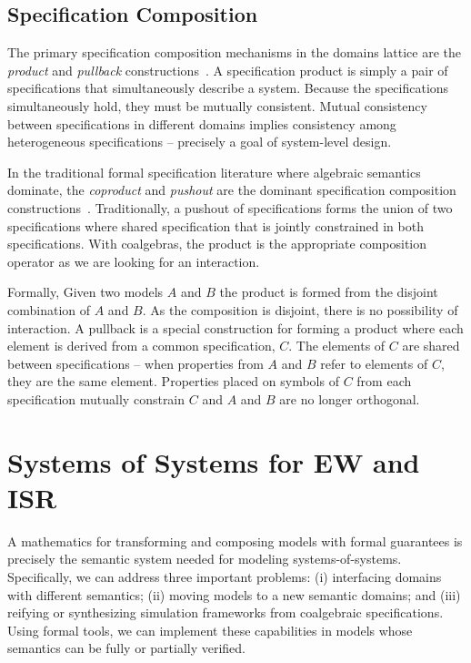 \documentclass[12pt]{article}
\begin{document}
\subsection{Specification Composition}

The primary specification composition mechanisms in the domains lattice are the
\emph{product} and \emph{pullback} constructions~\cite{Ehrig:85:Fundamentals-of}.  A
specification product is simply a pair of specifications that simultaneously describe a
system.  Because the specifications simultaneously hold, they must be mutually consistent.
Mutual consistency between specifications in different domains implies consistency among
heterogeneous specifications -- precisely a goal of system-level design.

In the traditional formal specification literature where algebraic semantics dominate, the
\emph{coproduct} and \emph{pushout} are the dominant specification composition
constructions~\cite{Ehrig:85:Fundamentals-of,Smith:93:Constructing-Sp,Smith:90:KIDS:-A-Semiaut}.
Traditionally, a pushout of specifications forms the union of two specifications where
shared specification that is jointly constrained in both specifications.  With coalgebras,
the product is the appropriate composition operator as we are looking for an interaction.

Formally, Given two models $A$ and $B$ the product is formed from the disjoint combination
of $A$ and $B$.  As the composition is disjoint, there is no possibility of interaction.
A pullback is a special construction for forming a product where each element is derived
from a common specification, $C$.  The elements of $C$ are shared between specifications
-- when properties from $A$ and $B$ refer to elements of $C$, they are the same element.
Properties placed on symbols of $C$ from each specification mutually constrain $C$ and $A$
and $B$ are no longer orthogonal.

\section{Systems of Systems for EW and ISR}

A mathematics for transforming and composing models with formal guarantees is precisely
the semantic system needed for modeling systems-of-systems.  Specifically, we can address
three important problems: (i) interfacing domains with different semantics; (ii) moving
models to a new semantic domains; and (iii) reifying or synthesizing simulation frameworks
from coalgebraic specifications.  Using formal tools, we can implement these capabilities
in models whose semantics can be fully or partially verified.
\end{document}
